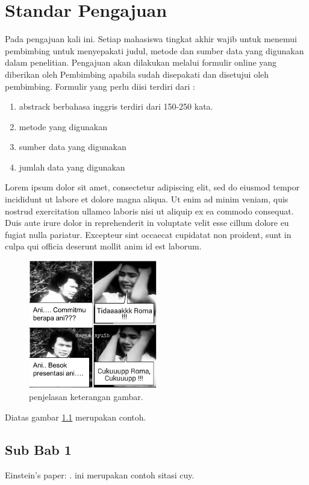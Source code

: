 \chapter{Standar Pengajuan}

Pada pengajuan kali ini. Setiap mahasiswa tingkat akhir wajib untuk menemui pembimbing untuk menyepakati judul, metode dan sumber data yang digunakan dalam penelitian. Pengajuan akan dilakukan melalui formulir online yang diberikan oleh Pembimbing apabila sudah disepakati dan disetujui oleh pembimbing. Formulir yang perlu diisi terdiri dari :
\begin{enumerate}
\item abstrack berbahasa inggris terdiri dari 150-250 kata.
\item metode yang digunakan
\item sumber data yang digunakan
\item jumlah data yang digunakan
\end{enumerate}
Lorem ipsum dolor sit amet, consectetur adipiscing elit, sed do eiusmod tempor incididunt ut labore et dolore magna aliqua. Ut enim ad minim veniam, quis nostrud exercitation ullamco laboris nisi ut aliquip ex ea commodo consequat. Duis aute irure dolor in reprehenderit in voluptate velit esse cillum dolore eu fugiat nulla pariatur. Excepteur sint occaecat cupidatat non proident, sunt in culpa qui officia deserunt mollit anim id est laborum.
\begin{figure}[ht]
	\centerline{\includegraphics[width=0.5\textwidth]{figures/commitroma.png}}
	\caption{penjelasan keterangan gambar.}
	\label{figure:labelgambar}
	\end{figure}
Diatas gambar \ref{figure:labelgambar} merupakan contoh.
\section{Sub Bab 1}
Einstein's paper: \cite{Einstein}. ini merupakan contoh sitasi cuy.
